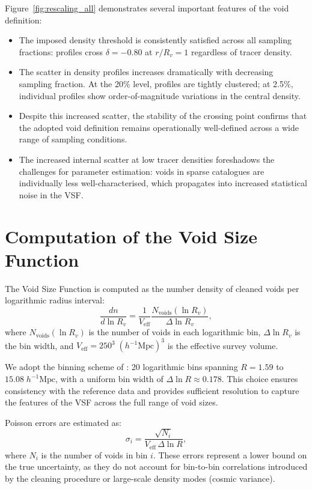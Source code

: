 \documentclass[12pt]{report}
\begin{document}
Figure~\ref{fig:rescaling_all} demonstrates several important features of the void definition:

\begin{itemize}
    \item The imposed density threshold is consistently satisfied across all sampling fractions: profiles cross $\delta = -0.80$ at $r/R_v = 1$ regardless of tracer density.
    \item The scatter in density profiles increases dramatically with decreasing sampling fraction. At the 20\% level, profiles are tightly clustered; at 2.5\%, individual profiles show order-of-magnitude variations in the central density.
    \item Despite this increased scatter, the stability of the crossing point confirms that the adopted void definition remains operationally well-defined across a wide range of sampling conditions.
    \item The increased internal scatter at low tracer densities foreshadows the challenges for parameter estimation: voids in sparse catalogues are individually less well-characterised, which propagates into increased statistical noise in the VSF.
\end{itemize}


\section{Computation of the Void Size Function}
\label{sec:vsf_computation}

The Void Size Function is computed as the number density of cleaned voids per logarithmic radius interval:
\begin{equation}
    \frac{dn}{d\ln R_v} = \frac{1}{V_\mathrm{eff}} \frac{N_\mathrm{voids}(\ln R_v)}{\Delta \ln R_v}
    \label{eq:vsf_computation},
\end{equation}
where $N_\mathrm{voids}(\ln R_v)$ is the number of voids in each logarithmic bin, $\Delta \ln R_v$ is the bin width, and $V_\mathrm{eff} = 250^3\;(h^{-1}\mathrm{Mpc})^3$ is the effective survey volume.

We adopt the binning scheme of \citet{Sartori2025}: 20 logarithmic bins spanning $R = 1.59$ to $15.08\;h^{-1}\mathrm{Mpc}$, with a uniform bin width of $\Delta\ln R \approx 0.178$. This choice ensures consistency with the reference data and provides sufficient resolution to capture the features of the VSF across the full range of void sizes.

Poisson errors are estimated as:
\begin{equation}
    \sigma_i = \frac{\sqrt{N_i}}{V_\mathrm{eff}\,\Delta\ln R}
    \label{eq:poisson_error},
\end{equation}
where $N_i$ is the number of voids in bin $i$. These errors represent a lower bound on the true uncertainty, as they do not account for bin-to-bin correlations introduced by the cleaning procedure or large-scale density modes (cosmic variance).
\end{document}
